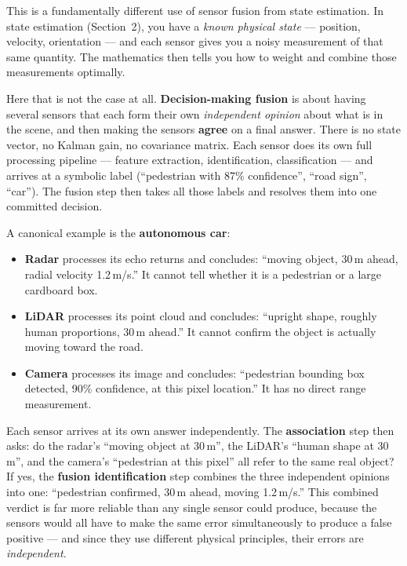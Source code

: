 \documentclass[12pt, a4paper]{article}
\begin{document}
This is a fundamentally different use of sensor fusion from state estimation.
In state estimation (Section~2), you have a \emph{known physical state} ---
position, velocity, orientation --- and each sensor gives you a noisy
measurement of that same quantity.
The mathematics then tells you how to weight and combine those measurements
optimally.

Here that is not the case at all.
\textbf{Decision-making fusion} is about having several sensors that each form
their own \emph{independent opinion} about what is in the scene, and then
making the sensors \textbf{agree} on a final answer.
There is no state vector, no Kalman gain, no covariance matrix.
Each sensor does its own full processing pipeline ---
feature extraction, identification, classification ---
and arrives at a symbolic label
(``pedestrian with 87\% confidence'', ``road sign'', ``car'').
The fusion step then takes all those labels and resolves them into one
committed decision.

A canonical example is the \textbf{autonomous car}:
\begin{itemize}[leftmargin=1.4em, itemsep=3pt]
  \item \textbf{Radar} processes its echo returns and concludes:
    ``moving object, 30\,m ahead, radial velocity 1.2\,m/s.''
    It cannot tell whether it is a pedestrian or a large cardboard box.
  \item \textbf{LiDAR} processes its point cloud and concludes:
    ``upright shape, roughly human proportions, 30\,m ahead.''
    It cannot confirm the object is actually moving toward the road.
  \item \textbf{Camera} processes its image and concludes:
    ``pedestrian bounding box detected, 90\% confidence, at this pixel
    location.''
    It has no direct range measurement.
\end{itemize}

Each sensor arrives at its own answer independently.
The \textbf{association} step then asks: do the radar's ``moving object at
30\,m'', the LiDAR's ``human shape at 30\,m'', and the camera's ``pedestrian
at this pixel'' all refer to the same real object?
If yes, the \textbf{fusion identification} step combines the three independent
opinions into one: ``pedestrian confirmed, 30\,m ahead, moving 1.2\,m/s.''
This combined verdict is far more reliable than any single sensor could
produce, because the sensors would all have to make the same error
simultaneously to produce a false positive --- and since they use different
physical principles, their errors are \emph{independent}.
\end{document}
